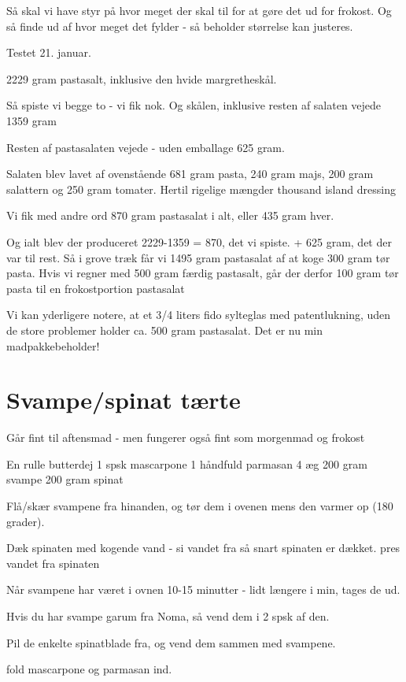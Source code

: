 \documentclass[
]{book}
\begin{document}
Så skal vi have styr på hvor meget der skal til for at gøre det ud for frokost. Og så
finde ud af hvor meget det fylder - så beholder størrelse kan justeres.

Testet 21. januar.

2229 gram pastasalt, inklusive den hvide margretheskål.

Så spiste vi begge to - vi fik nok. Og skålen, inklusive
resten af salaten vejede 1359 gram

Resten af pastasalaten vejede - uden emballage 625 gram.

Salaten blev lavet af ovenstående 681 gram pasta, 240 gram
majs, 200 gram salattern og 250 gram tomater. Hertil rigelige
mængder thousand island dressing

Vi fik med andre ord 870 gram pastasalat i alt, eller 435 gram hver.

Og ialt blev der produceret
2229-1359 = 870, det vi spiste.
+ 625 gram, det der var til rest.
Så i grove træk får vi 1495 gram pastasalat af at koge 300 gram
tør pasta. Hvis vi regner med 500 gram færdig pastasalt,
går der derfor 100 gram tør pasta til en frokostportion pastasalat

Vi kan yderligere notere, at et 3/4 liters fido sylteglas med
patentlukning, uden de store problemer holder ca. 500 gram
pastasalat. Det er nu min madpakkebeholder!

\hypertarget{svampespinat-tuxe6rte}{%
\section{Svampe/spinat tærte}\label{svampespinat-tuxe6rte}}

Går fint til aftensmad - men fungerer også fint som morgenmad
og frokost

En rulle butterdej
1 spsk mascarpone
1 håndfuld parmasan
4 æg
200 gram svampe
200 gram spinat

Flå/skær svampene fra hinanden, og tør dem i ovenen mens den
varmer op (180 grader).

Dæk spinaten med kogende vand - si vandet fra så snart spinaten er
dækket.
pres vandet fra spinaten

Når svampene har været i ovnen 10-15 minutter - lidt længere i min,
tages de ud.

Hvis du har svampe garum fra Noma, så vend dem i 2 spsk af den.

Pil de enkelte spinatblade fra, og vend dem sammen med svampene.

fold mascarpone og parmasan ind.
\end{document}
